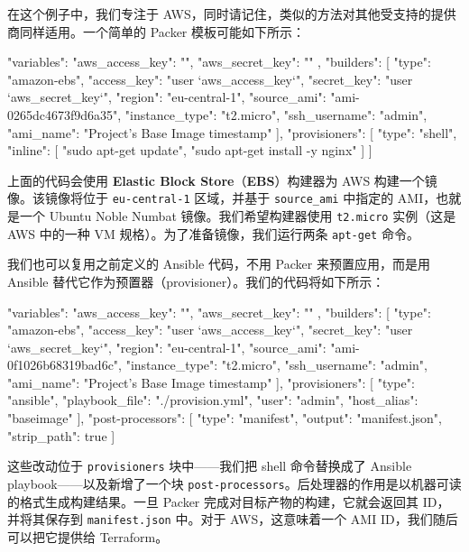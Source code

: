 在这个例子中，我们专注于 AWS，同时请记住，类似的方法对其他受支持的提供商同样适用。一个简单的 Packer 模板可能如下所示：

\begin{codebox}[json]
{
  "variables": {
    "aws_access_key": "",
    "aws_secret_key": ""
  },
  "builders": [{
    "type": "amazon-ebs",
    "access_key": "{{user `aws_access_key`}}",
    "secret_key": "{{user `aws_secret_key`}}",
    "region": "eu-central-1",
    "source_ami": "ami-0265dc4673f9d6a35",
    "instance_type": "t2.micro",
    "ssh_username": "admin",
    "ami_name": "Project's Base Image {{timestamp}}"
  }],
  "provisioners": [{
    "type": "shell",
    "inline": [
      "sudo apt-get update",
      "sudo apt-get install -y nginx"
    ]
  }]
}
\end{codebox}

上面的代码会使用 \textbf{Elastic Block Store}（\textbf{EBS}）构建器为 AWS 构建一个镜像。该镜像将位于 \texttt{eu-central-1} 区域，并基于 \texttt{source\_\allowbreak{}ami} 中指定的 AMI，也就是一个 Ubuntu Noble Numbat 镜像。我们希望构建器使用 \texttt{t2.micro} 实例（这是 AWS 中的一种 VM 规格）。为了准备镜像，我们运行两条 \texttt{apt-get} 命令。

我们也可以复用之前定义的 Ansible 代码，不用 Packer 来预置应用，而是用 Ansible 替代它作为预置器（provisioner）。我们的代码将如下所示：

\begin{codebox}[json]
{
  "variables": {
    "aws_access_key": "",
    "aws_secret_key": ""
  },
  "builders": [{
    "type": "amazon-ebs",
    "access_key": "{{user `aws_access_key`}}",
    "secret_key": "{{user `aws_secret_key`}}",
    "region": "eu-central-1",
    "source_ami": "ami-0f1026b68319bad6c",
    "instance_type": "t2.micro",
    "ssh_username": "admin",
    "ami_name": "Project's Base Image {{timestamp}}"
  }],
  "provisioners": [{
    "type": "ansible",
    "playbook_file": "./provision.yml",
    "user": "admin",
    "host_alias": "baseimage"
  }],
  "post-processors": [{
    "type": "manifest",
    "output": "manifest.json",
    "strip_path": true
  }]
}
\end{codebox}

\label{idx:978}
\label{idx:979}
这些改动位于 \texttt{provisioners} 块中——我们把 shell 命令替换成了 Ansible playbook——以及新增了一个块 \texttt{post-processors}。后处理器的作用是以机器可读的格式生成构建结果。一旦 Packer 完成对目标产物的构建，它就会返回其 ID，并将其保存到 \texttt{manifest.\allowbreak{}json} 中。对于 AWS，这意味着一个 AMI ID，我们随后可以把它提供给 Terraform。

